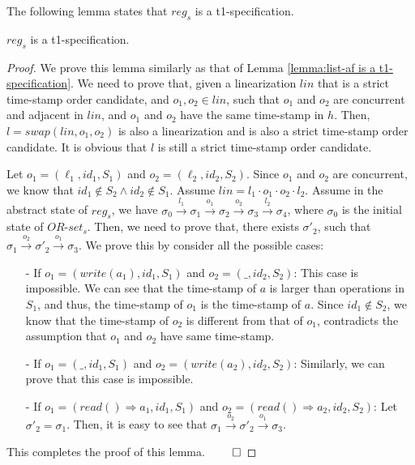 {The following lemma states that $\mathit{reg}_s$ is a t1-specification.

\begin{lemma}
\label{lemma:reg is a t1-specification}
$\mathit{reg}_s$ is a t1-specification.
\end{lemma}

\begin {proof}

We prove this lemma similarly as that of Lemma \ref{lemma:list-af is a t1-specification}. We need to prove that, given a linearization $\mathit{lin}$ that is a strict time-stamp order candidate, and $o_1,o_2 \in \mathit{lin}$, such that $o_1$ and $o_2$ are concurrent and adjacent in $\mathit{lin}$, and $o_1$ and $o_2$ have the same time-stamp in $h$. Then, $l = \mathit{swap}(\mathit{lin},o_1,o_2)$ is also a linearization and is also a strict time-stamp order candidate. It is obvious that $l$ is still a strict time-stamp order candidate.

Let $o_1 = (\ell_1,\mathit{id}_1,S_1)$ and $o_2 = (\ell_2,\mathit{id}_2,S_2)$. Since $o_1$ and $o_2$ are concurrent, we know that $\mathit{id}_1 \notin S_2 \wedge \mathit{id}_2 \notin S_1$. Assume $\mathit{lin} = l_1 \cdot o_1 \cdot o_2 \cdot l_2$. Assume in the abstract state of $\mathit{reg}_s$, we have $\sigma_0 {\xrightarrow{l_1}} \sigma_1 {\xrightarrow{o_1}} \sigma_2 {\xrightarrow{o_2}} \sigma_3 {\xrightarrow{l_2}} \sigma_4$, where $\sigma_0$ is the initial state of $\mathit{OR}$-$\mathit{set}_s$. Then, we need to prove that, there exists $\sigma'_2$, such that $\sigma_1 {\xrightarrow{o_2}} \sigma'_2 {\xrightarrow{o_1}} \sigma_3$. We prove this by consider all the possible cases:


\begin{itemize}
\setlength{\itemsep}{0.5pt}
\item[-] If $o_1 = (\mathit{write}(a_1),\mathit{id}_1,S_1)$ and $o_2 = (\_,\mathit{id}_2,S_2)$: This case is impossible. We can see that the time-stamp of $a$ is larger than operations in $S_1$, and thus, the time-stamp of $o_1$ is the time-stamp of $a$. Since $\mathit{id}_1 \notin S_2$, we know that the time-stamp of $o_2$ is different from that of $o_1$, contradicts the assumption that $o_1$ and $o_2$ have same time-stamp.

\item[-] If $o_1 = (\_,\mathit{id}_1,S_1)$ and $o_2 = (\mathit{write}(a_2),\mathit{id}_2,S_2)$: Similarly, we can prove that this case is impossible.

\item[-] If $o_1 = (\mathit{read}() \Rightarrow a_1,\mathit{id}_1,S_1)$ and $o_2 = (\mathit{read}() \Rightarrow a_2,\mathit{id}_2,S_2)$: Let $\sigma'_2 = \sigma_1$. Then, it is easy to see that $\sigma_1 {\xrightarrow{o_2}} \sigma'_2 {\xrightarrow{o_1}} \sigma_3$.
\end{itemize}
This completes the proof of this lemma. $\qed$
\end {proof}


}
